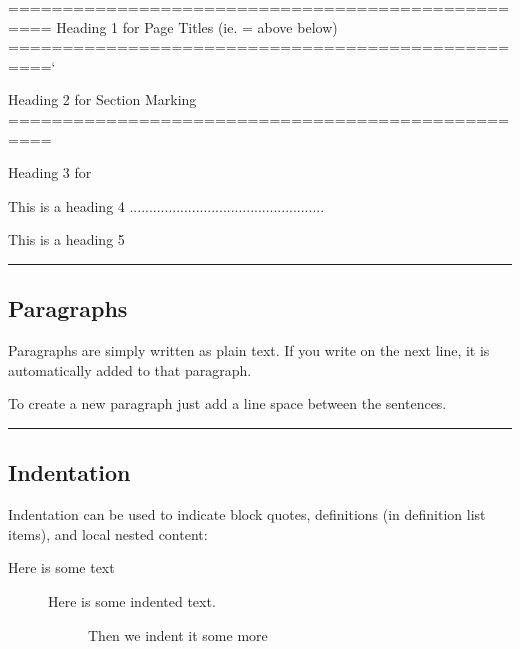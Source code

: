 \documentclass[letterpaper,10pt,english]{sphinxmanual}
\begin{document}
\begin{sphinxVerbatim}[commandchars=\\\{\}]
==================================================
Heading 1 \PYGZhy{} for Page Titles (ie. \PYGZdq{}=\PYGZdq{} above \PYGZam{} below)
=================================================={}`

Heading 2 \PYGZhy{} for Section Marking
==================================================

Heading 3 \PYGZhy{} for
\PYGZhy{}\PYGZhy{}\PYGZhy{}\PYGZhy{}\PYGZhy{}\PYGZhy{}\PYGZhy{}\PYGZhy{}\PYGZhy{}\PYGZhy{}\PYGZhy{}\PYGZhy{}\PYGZhy{}\PYGZhy{}\PYGZhy{}\PYGZhy{}\PYGZhy{}\PYGZhy{}\PYGZhy{}\PYGZhy{}\PYGZhy{}\PYGZhy{}\PYGZhy{}\PYGZhy{}\PYGZhy{}\PYGZhy{}\PYGZhy{}\PYGZhy{}\PYGZhy{}\PYGZhy{}\PYGZhy{}\PYGZhy{}\PYGZhy{}\PYGZhy{}\PYGZhy{}\PYGZhy{}\PYGZhy{}\PYGZhy{}\PYGZhy{}\PYGZhy{}\PYGZhy{}\PYGZhy{}\PYGZhy{}\PYGZhy{}\PYGZhy{}\PYGZhy{}\PYGZhy{}\PYGZhy{}\PYGZhy{}\PYGZhy{}

This is a heading 4
..................................................

This is a heading 5
\PYGZti{}\PYGZti{}\PYGZti{}\PYGZti{}\PYGZti{}\PYGZti{}\PYGZti{}\PYGZti{}\PYGZti{}\PYGZti{}\PYGZti{}\PYGZti{}\PYGZti{}\PYGZti{}\PYGZti{}\PYGZti{}\PYGZti{}\PYGZti{}\PYGZti{}\PYGZti{}\PYGZti{}\PYGZti{}\PYGZti{}\PYGZti{}\PYGZti{}\PYGZti{}\PYGZti{}\PYGZti{}\PYGZti{}\PYGZti{}\PYGZti{}\PYGZti{}\PYGZti{}\PYGZti{}\PYGZti{}\PYGZti{}\PYGZti{}\PYGZti{}\PYGZti{}\PYGZti{}\PYGZti{}\PYGZti{}\PYGZti{}\PYGZti{}\PYGZti{}\PYGZti{}\PYGZti{}\PYGZti{}\PYGZti{}\PYGZti{}
\end{sphinxVerbatim}


\bigskip\hrule\bigskip



\subsection{Paragraphs}
\label{\detokenize{guide/99_rst-guide:paragraphs}}
Paragraphs are simply written as plain text.
If you write on the next line, it is automatically added to that paragraph.

To create a new paragraph just add a line space between the sentences.


\bigskip\hrule\bigskip



\subsection{Indentation}
\label{\detokenize{guide/99_rst-guide:indentation}}
Indentation can be used to indicate block quotes, definitions (in definition list items), and local nested content:
\begin{description}
\item[{Here is some text}] \leavevmode\begin{description}
\item[{Here is some indented text.}] \leavevmode
Then we indent it some more

\end{description}

\end{description}
\end{document}
